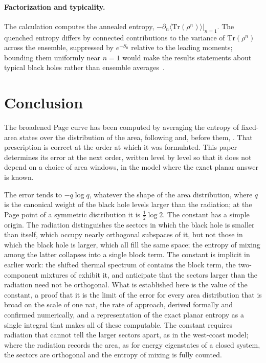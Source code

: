 \documentclass[11pt,letterpaper]{article}
\theoremstyle{plain}
\theoremstyle{definition}
\theoremstyle{remark}
\begin{document}
\paragraph{Factorization and typicality.} The calculation computes the annealed entropy, $-\partial_n \langle\mathrm{Tr}(\rho^n)\rangle|_{n=1}$. The quenched entropy differs by connected contributions to the variance of $\mathrm{Tr}(\rho^n)$ across the ensemble, suppressed by $e^{-S_0}$ relative to the leading moments; bounding them uniformly near $n = 1$ would make the results statements about typical black holes rather than ensemble averages~\citep{marolfmaxfield2020, saadetal2019}.


\section{Conclusion}
\label{sec07:conclusion}

The broadened Page curve has been computed by averaging the entropy of fixed-area states over the distribution of the area, following \citet{marolfwangwang2020} and, before them, \citet{murthysrednicki2019}. That prescription is correct at the order at which it was formulated. This paper determines its error at the next order, written level by level so that it does not depend on a choice of area windows, in the model where the exact planar answer is known.

The error tends to $-q\log q$, whatever the shape of the area distribution, where $q$ is the canonical weight of the black hole levels larger than the radiation; at the Page point of a symmetric distribution it is $\tfrac12\log 2$. The constant has a simple origin. The radiation distinguishes the sectors in which the black hole is smaller than itself, which occupy nearly orthogonal subspaces of it, but not those in which the black hole is larger, which all fill the same space; the entropy of mixing among the latter collapses into a single block term. The constant is implicit in earlier work: the shifted thermal spectrum of \citet{pssyetal2022} contains the block term, the two-component mixtures of \citet{akerspenington2021} exhibit it, and \citet{marolfwangwang2020} anticipate that the sectors larger than the radiation need not be orthogonal. What is established here is the value of the constant, a proof that it is the limit of the error for every area distribution that is broad on the scale of one nat, the rate of approach, derived formally and confirmed numerically, and a representation of the exact planar entropy as a single integral that makes all of these computable. The constant requires radiation that cannot tell the larger sectors apart, as in the west-coast model; where the radiation records the area, as for energy eigenstates of a closed system, the sectors are orthogonal and the entropy of mixing is fully counted.
\end{document}
